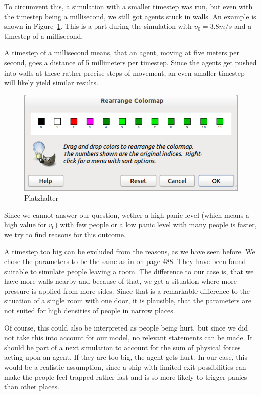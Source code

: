 \documentclass[11pt]{article}
\begin{document}
To circumvent this, a simulation with a smaller timestep was run, but even with the timestep 
being a millisecond, we still got agents stuck in walls. An example is shown in Figure~\ref{stuckinwall}. This is a part during the simulation with \(v_0 = 3.8m/s\) and a timestep of a millisecond.

A timestep of a millisecond means, that an agent, moving at five meters per second,
goes a distance of 5 millimeters per timestep. Since the agents get pushed into walls
at these rather precise steps of movement, an even smaller timestep will likely yield similar results. 

\begin{figure}[h]
	\centering
	\includegraphics[scale=0.5]{images/gimp.png}
	\caption{Platzhalter}
	\label{stuckinwall}
	
\end{figure}

Since we cannot answer our question, wether a high panic level (which means a high value for \(v_0\))
with few people
or a low panic level with many people is faster, we try to find reasons for this outcome.

A timestep too big can be excluded from the reasons, as we have seen before.
We chose the parameters to be the same as in \cite{helbing} on page 488.
They have been found suitable to simulate people leaving a room.
The difference to our case is, that we have more walls nearby and
because of that, we get a situation where more pressure is applied from more sides. 
Since that is a remarkable difference to the situation of a single room with one door, 
it is plausible, that the parameters are not suited for high densities of people in 
narrow places. 

Of course, this could also be interpreted as people being hurt, but since
we did not take this into account for our model, no relevant statements can
be made. It should be part of a next simulation to account for the sum of 
physical forces acting upon an agent. If they are too big, the agent gets hurt.
In our case, this would be a realistic assumption, since a ship with limited
exit possibilities can make the people feel trapped rather fast and is so more
likely to trigger panics than other places.
\end{document}
